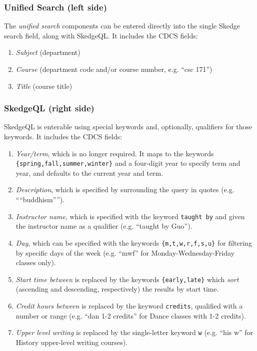 \subsubsection{Unified Search (left side)}

The \emph{unified search} components can be entered directly into the single Skedge search field, along with SkedgeQL. It includes the CDCS fields:

\begin{enumerate}
  \item \emph{Subject} (department)
  \item \emph{Course} (department code and/or course number, e.g. ``csc 171'')
  \item \emph{Title} (course title)
\end{enumerate}

\subsubsection{SkedgeQL (right side)}

SkedgeQL is enterable using special keywords and, optionally, qualifiers for those keywords. It includes the CDCS fields:

\begin{enumerate}
  \item \emph{Year/term}, which is no longer required. It maps to the keywords {\tt \{spring,fall,summer,winter\}} and a four-digit year to specify term and year, and defaults to the current year and term.

  \item \emph{Description}, which is specified by surrounding the query in quotes (e.g. ````buddhism'''').

  \item \emph{Instructor name}, which is specified with the keyword {\tt taught by} and given the instructor name as a qualifier (e.g. ``taught by Guo'').

  \item \emph{Day}, which can be specified with the keywords {\tt \{m,t,w,r,f,s,u\}} for filtering by specific days of the week (e.g. ``mwf'' for Monday-Wednesday-Friday classes only).

  \item \emph{Start time between} is replaced by the keywords {\tt \{early,late\}} which \emph{sort} (ascending and descending, respectively) the results by start time.

  \item \emph{Credit hours between} is replaced by the keyword {\tt credits}, qualified with a number or range (e.g. ``dan 1-2 credits'' for Dance classes with 1-2 credits).

  \item \emph{Upper level writing} is replaced by the single-letter keyword {\tt w} (e.g. ``his w'' for History upper-level writing courses).
\end{enumerate}

